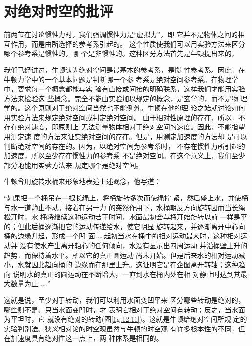 \documentclass[../outline-of-mechanics.tex]{subfiles}
\begin{document}
\section{对绝对时空的批评}\label{sec:12.03}

前两节在讨论惯性力时，我们强调惯性力是“虚拟力”，即
它并不是物体之间的相互作用，而是由所选择的参考系引起的。
这个性质使我们可以用实验方法来区分哪个参考系是惯性的，哪
个是非惯性的。这种区分方法首先是牛顿提出来的。

我们已经讲过，牛顿认为绝对空间是最基本的参考系，是惯
性参考系。因此，在牛顿力学中的一个基本问题是判断哪一个参
考系是绝对空间参考系。在物理学中，要求每一个概念都能与实
验有直接或间接的明确联系，这样我们才能用实验方法来检验这
些概念。完全不能由实验加以规定的概念，是玄学的，而不是物
理学的。这个原则对于绝对空间当然也不能例外。牛顿在他的理
论之始就讨论如何用实验方法来规定绝对空间或判定绝对空间。
由于相对性原理的存在，所以，不存在绝对速度，即原则上
无法测量物体相对于绝对空间的速度。因此，不能指望用测定速
度的方法来证实绝对空间的存在。但是，用测定加速度的方法却
是可以判断绝对空间的存在的。因为，以绝对空间为参考系时，
不存在惯性力所引起的加速度，所以至少存在惯性力的参考系
不是绝对空间。在这个意义上，我们至少部分地能用实验方法来
规定哪个是绝对空间。

牛顿曾用旋转水桶来形象地表述上述观念，他写道：

\begin{quoting}
  “如果把一个桶吊在一根长绳上，将桶旋转多次而使绳拧
  紧，然后盛上水，并使桶与水一道静止不动。接着在另一力
  的突然作用下，水桶朝反方向旋转因而当长绳松开时，水
  桶将继续这种运动若干时间，水面最初会与桶开始旋转以前
  一样是平的；但此后桶逐渐把它的运动传递给水，使它明显
  旋转起来，并逐渐离开中心向桶的边缘升起，形成一个凹
  面……起初当水在桶中的相对运动最大时，这种相对运动并
  没有使水产生离开轴心的任何倾向，水没有显示出四周运动
  并沿桶壁上升的趋势，而保持着水平。所以它的真正圆运动
  尚未开始。但是后来水的相对运动减小，水就因此趋向桶的
  边缘而在那里上升。这证明它是在企图离开转轴；这种趋向
  说明水的真正的圆运动在不断增大，一直到水在桶内处在相
  对静止时达到其最大数量为止……”
\end{quoting}

这就是说，至少对于转动，我们可以利用水面变凹平来
区分哪些转动是绝对的，哪些则不是。只当水面变凹时，才
表明它相对于绝对空间有转动；反之，当水面为平坦时，它
就没有绝对的转动(图\ref{fig:12.11})。这就是牛顿给绝对空间所规
定的实验判别法。狭义相对论的时空观虽然与牛顿的时空观
有许多根本性的不同，但在加速度具有绝对性这一点上，两
种体系是相同的。
\end{document}
